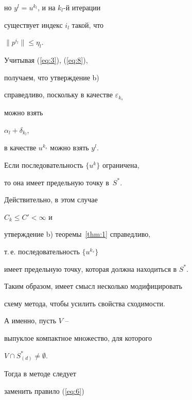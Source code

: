 \begin{pf}
но $y^{l}=u^{k_{l}}$, и на $k_{l}$-й итерации


существует индекс $i_{l}$ такой, что


$ \|p^{i_{l}}\|\leq\eta_{l}$.


Учитывая (\ref{eq:3}), (\ref{eq:8}),


получаем, что утверждение b)


справедливо, поскольку в качестве $\varepsilon_{k_{s}}$


можно взять


$\alpha_{l}+\delta_{ k_{l}}$,


в качестве $u^{k_{s}}$ можно взять $y^{l}$.


\end{pf}





\begin{cornonum}


\label{cor:1}


Если последовательность $ \{ u^{k} \}$ ограничена,


то она имеет предельную точку в~$S^{*}$.


\end{cornonum}





\begin{pf}


Действительно, в этом случае


$C_k \leq C' < \infty $ и


утверждение b) теоремы~\ref{thm:1} справедливо,


т.\,е.{} последовательность $\{u^{k_{s}}\}$


имеет предельную точку, которая должна находиться в $ S^{*}$.


\end{pf}








Таким образом, имеет смысл несколько модифицировать


схему метода, чтобы усилить свойства сходимости.


А именно, пусть $V$ --


выпуклое компактное множество, для которого


$V \cap S^{*}_{(d)} \neq \emptyset$.


Тогда в методе следует


заменить правило (\ref{eq:6})


